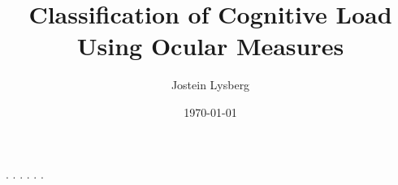 \documentclass[american,titlepage]{ntnuthesis}
\title{Classification of Cognitive Load Using Ocular Measures}
\author{Jostein Lysberg}
\date{\today}
\begin{document}



\tableofcontents


\printnoidxglossaries

% 
% 

{.}
{.}
{.}
{.}
{.}
{.}
% 
% 
% 
% 

\chapter*{\bibname}
\printbibliography[heading=none]

% 
\end{document}

